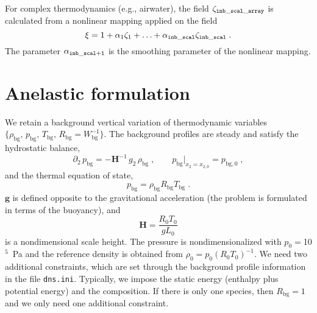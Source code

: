 For complex thermodynamics (e.g., airwater), the field $\zeta_\mathrm{\tt inb\_scal\_array}$ is calculated from a nonlinear mapping applied on the field
\begin{equation}
  \xi =1+\alpha_1\zeta_1+\ldots+\alpha_\mathrm{\tt inb\_scal}\zeta_\mathrm{\tt inb\_scal}\;.
\end{equation}
The parameter $\alpha_\mathrm{\tt inb\_scal+1}$ is the smoothing parameter of the nonlinear mapping.

\section{Anelastic formulation}

We retain a background vertical variation of thermodynamic variables $\{\rho_\mathrm{bg},\, p_\mathrm{bg},\, T_\mathrm{bg},\, R_\mathrm{bg}=W_\mathrm{bg}^{-1}\}$. The background profiles are steady and satisfy the hydrostatic balance,
\begin{equation}
  \partial_2\,p_\mathrm{bg}=-\mathbf{H}^{-1}\, g_2\,\rho_\mathrm{bg}\;,\qquad p_\mathrm{bg}|_{x_2=x_{2,0}}=p_{\mathrm{bg},0}\;,
\end{equation}
and the thermal equation of state,
\begin{equation}
  p_\mathrm{bg}  = \rho_\mathrm{bg} R_\mathrm{bg} T_\mathrm{bg} \;.
\end{equation}
$\mathbf{g}$ is defined opposite to the gravitational acceleration (the problem is formulated in terms of the buoyancy), and
\begin{equation}
  \mathbf{H} = \frac{R_0T_0}{gL_0}
\end{equation}
is a nondimensional scale height. The pressure is nondimensionalized with $p_0=$10$^5$~Pa and the reference density is obtained from $\rho_0=p_0(R_0T_0)^{-1}$. We need two additional constraints, which are set through the background profile information in the file {\tt dns.ini}. Typically, we impose the static energy (enthalpy plus potential energy) and the composition.
%
If there is only one species, then $R_\mathrm{bg}=1$ and we only need one additional constraint.

